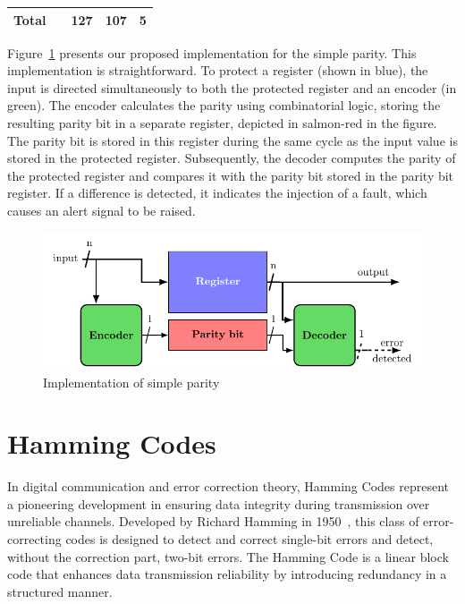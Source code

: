 \begin{table}[t]
\begin{tabular}{@{}ccccc@{}}
        Total   &                                                                                                   & 127                                                      & 107                                                                & 5                                                               \\
        \bottomrule
    \end{tabular}
\end{table}

Figure~\ref{fig:implementation_sp} presents our proposed implementation for the simple parity. This implementation is straightforward. To protect a register (shown in blue), the input is directed simultaneously to both the protected register and an encoder (in green). The encoder calculates the parity using combinatorial logic, storing the resulting parity bit in a separate register, depicted in salmon-red in the figure. The parity bit is stored in this register during the same cycle as the input value is stored in the protected register. Subsequently, the decoder computes the parity of the protected register and compares it with the parity bit stored in the parity bit register. If a difference is detected, it indicates the injection of a fault, which causes an alert signal to be raised.

\begin{figure}[ht]
    \centering
    \includegraphics[page=1]{c5_countermeasures_dift/img/archi_contremesures.pdf}
    \caption{Implementation of simple parity}
    \label{fig:implementation_sp}
\end{figure}

\section{Hamming Codes}
\label{chapter:hammingcode}

In digital communication and error correction theory, Hamming Codes represent a pioneering development in ensuring data integrity during transmission over unreliable channels. Developed by Richard Hamming in 1950~\cite{H-50-bstj}, this class of error-correcting codes is designed to detect and correct single-bit errors and detect, without the correction part, two-bit errors. The Hamming Code is a linear block code that enhances data transmission reliability by introducing redundancy in a structured manner.

